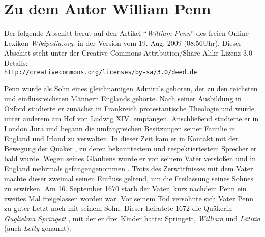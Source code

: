 \chapter{Zu dem Autor William Penn} \label{ref:zum_autor_penn}

\begin{center}
\begin{footnotesize}
\begin{minipage}[c]{7.5cm}
Der folgende Abschitt berut auf den Artikel "`\textit{William Penn}"' des freien
Online-Lexikon \textit{Wikipedia.org}. in der Version vom  19. Aug. 2009
(08:56Uhr). Dieser Abschitt steht unter der Creative Commons
Attribution/Share-Alike Lizenz 3.0 Details:
\\ \texttt{http://creativecommons.org/licenses/by-sa/3.0/deed.de}
\end{minipage}
\end{footnotesize}
\end{center}


\smallskip

Penn wurde als Sohn eines gleichnamigen Admirals geboren, der zu den
reichsten und einflussreichsten Männern Englands gehörte. Nach seiner
Ausbildung in Oxford studierte er zunächst in Frankreich
 protestantische Theologie
 und wurde unter anderem am Hof von Ludwig XIV.
 empfangen. Anschließend studierte
 er in London  Jura
und begann die umfangreichen Besitzungen seiner Familie in England
 und Irland  zu verwalten. In dieser
Zeit kam er in Kontakt mit der Bewegung der Quaker , zu deren
bekanntestem und respektiertestem Sprecher er bald wurde. Wegen seines Glaubens
wurde er von seinem Vater  verstoßen und in England
mehrmals gefangengenommen . Trotz des Zerwürfnisses mit
dem Vater machte dieser zweimal seinen Einfluss geltend, um die Freilassung
seines Sohnes zu erwirken. Am 16. September 1670 starb der Vater, kurz nachdem
Penn ein zweites Mal freigelassen worden war. Vor seinem Tod versöhnte sich
Vater Penn zu guter Letzt noch mit seinem Sohn. Dieser heiratete 
1672 die Quäkerin \textit{Guglielma Springett} , mit der er drei Kinder hatte: Springett,
\textit{William} und
\textit{Lätitia} (auch \textit{Letty} genannt).

